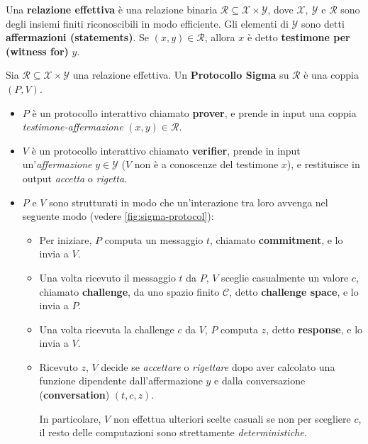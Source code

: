 \begin{de} Una \textbf{relazione effettiva} è una relazione binaria $\mathcal{R} \subseteq \mathcal{X} \times \mathcal{Y}$, dove $\mathcal{X},\ \mathcal{Y} \text{ e } \mathcal{R}$ sono degli insiemi finiti riconoscibili in modo efficiente. Gli elementi di $\mathcal{Y}$ sono detti \textbf{affermazioni (statements)}. Se $(x, y) \in \mathcal{R}$, allora $x$ è detto \textbf{testimone per (witness for)} $y$.
\end{de}

\begin{de}\label{def:sigma} Sia $\mathcal{R} \subseteq \mathcal{X} \times \mathcal{Y}$ una relazione effettiva. Un \textbf{Protocollo Sigma} su $\mathcal{R}$ è una coppia $(P, V)$.
	\begin{itemize}[itemsep=0.3em, topsep=0.2em]
		\item $P$ è un protocollo interattivo chiamato \textbf{prover}, e prende in input una coppia \textit{testimone-affermazione} $(x, y) \in \mathcal{R}$.
		\item $V$ è un protocollo interattivo chiamato \textbf{verifier}, prende in input un'\textit{affermazione} $y \in \mathcal{Y}$ ($V$ non è a conoscenze del testimone $x$), e restituisce in output \textit{accetta} o \textit{rigetta}.
		\item $P$ e $V$ sono strutturati in modo che un'interazione tra loro avvenga nel seguente modo (vedere \autoref{fig:sigma-protocol}):
		      \begin{itemize}[itemsep=0.1em, topsep=0.2em]
		      	\item Per iniziare, $P$ computa un messaggio $t$, chiamato \textbf{commitment}, e lo invia a $V$.
		      	\item Una volta ricevuto il messaggio $t$ da $P$, $V$ sceglie casualmente un valore $c$, chiamato \textbf{challenge}, da uno spazio finito $\mathcal{C}$, detto \textbf{challenge space}, e lo invia a $P$.
		      	\item Una volta ricevuta la challenge $c$ da $V$, $P$ computa  $z$, detto \textbf{response}, e lo invia a $V$.
		      	\item Ricevuto $z$, $V$ decide se \textit{accettare} o \textit{rigettare} dopo aver calcolato una funzione dipendente dall'affermazione $y$ e dalla conversazione (\textbf{conversation}) $(t, c, z)$.
		      	              
		      	      In particolare, $V$ non effettua ulteriori scelte casuali se non per scegliere $c$, il resto delle computazioni sono strettamente \textit{deterministiche}. 
		      \end{itemize}
	\end{itemize}
\end{de}

